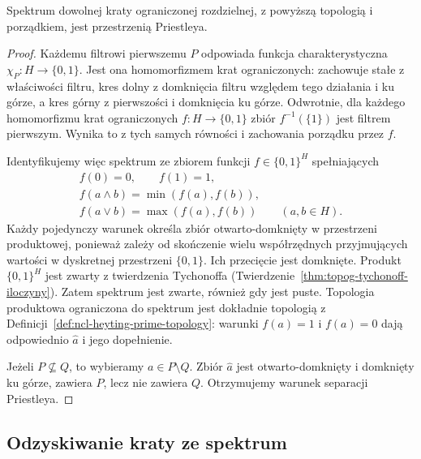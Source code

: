 \begin{twierdzenie}
\label{thm:ncl-heyting-prime-compact}
Spektrum dowolnej kraty ograniczonej rozdzielnej,
z powyższą topologią i porządkiem, jest przestrzenią
Priestleya.
\end{twierdzenie}
\begin{proof}
Każdemu filtrowi pierwszemu $P$ odpowiada funkcja
charakterystyczna $\chi_P:H\to\{0,1\}$.
Jest ona homomorfizmem krat ograniczonych:
zachowuje stałe z właściwości filtru,
kres dolny z domknięcia filtru względem
tego działania i ku górze, a kres górny
z pierwszości i domknięcia ku górze.
Odwrotnie, dla każdego homomorfizmu krat
ograniczonych $f:H\to\{0,1\}$ zbiór
$f^{-1}(\{1\})$ jest filtrem pierwszym.
Wynika to z tych samych równości i zachowania
porządku przez $f$.

Identyfikujemy więc spektrum ze zbiorem
funkcji $f\in\{0,1\}^H$ spełniających
\[
\begin{gathered}
 f(0)=0,\qquad f(1)=1,\\
 f(a\wedge b)=\min(f(a),f(b)),\\
 f(a\vee b)=\max(f(a),f(b))\qquad(a,b\in H).
\end{gathered}
\]
Każdy pojedynczy warunek określa zbiór
otwarto-domknięty w przestrzeni produktowej,
ponieważ zależy od skończenie wielu współrzędnych
przyjmujących wartości w dyskretnej przestrzeni
$\{0,1\}$. Ich przecięcie jest domknięte.
Produkt $\{0,1\}^H$ jest zwarty z twierdzenia
Tychonoffa
(Twierdzenie~\ref{thm:topog-tychonoff-iloczyny}).
Zatem spektrum jest zwarte, również gdy jest puste.
Topologia produktowa ograniczona do spektrum
jest dokładnie topologią z
Definicji~\ref{def:ncl-heyting-prime-topology}:
warunki $f(a)=1$ i $f(a)=0$ dają odpowiednio
$\widehat a$ i jego dopełnienie.

Jeżeli $P\not\subseteq Q$, to wybieramy
$a\in P\setminus Q$. Zbiór $\widehat a$
jest otwarto-domknięty i domknięty ku górze,
zawiera $P$, lecz nie zawiera $Q$.
Otrzymujemy warunek separacji Priestleya.
\end{proof}

\subsection{Odzyskiwanie kraty ze spektrum}

